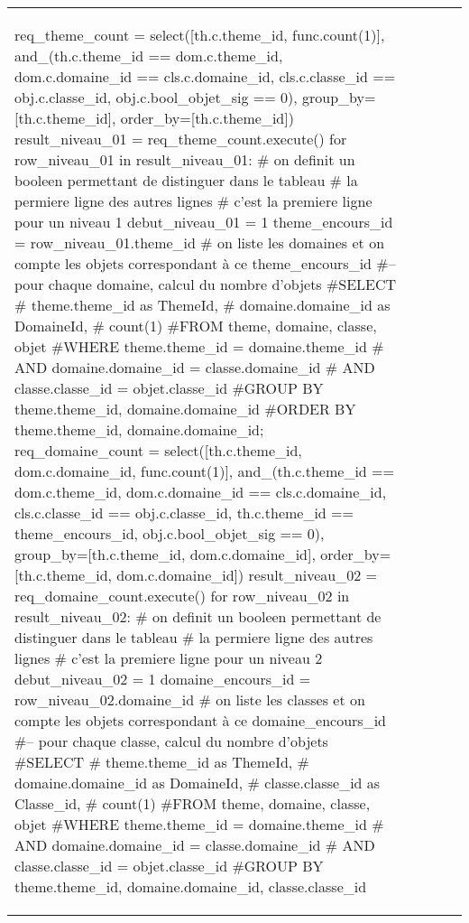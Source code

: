 \documentclass[12pt,titlepage]{book}
\begin{document}
\begin{supertabular}{|p{7.5cm}|p{7.5cm}|p{7.5cm}|c|p{10cm}|}
\begin{lbdpython}
req_theme_count = select([th.c.theme_id, func.count(1)],
                  and_(th.c.theme_id == dom.c.theme_id,
                       dom.c.domaine_id == cls.c.domaine_id,
                       cls.c.classe_id == obj.c.classe_id,
                       obj.c.bool_objet_sig == 0),
                  group_by=[th.c.theme_id],
                  order_by=[th.c.theme_id])
result_niveau_01 = req_theme_count.execute()
for row_niveau_01 in result_niveau_01:
   # on definit un booleen permettant de distinguer dans le tableau
   # la permiere ligne des autres lignes
   # c'est la premiere ligne pour un niveau 1
   debut_niveau_01 = 1
   theme_encours_id = row_niveau_01.theme_id
   # on liste les domaines et on compte les objets correspondant à ce theme_encours_id
   #-- pour chaque domaine, calcul du nombre d'objets
   #SELECT
   #   theme.theme_id as ThemeId,
   #   domaine.domaine_id as DomaineId,
   #   count(1)
   #FROM theme, domaine, classe, objet
   #WHERE theme.theme_id = domaine.theme_id
   #  AND domaine.domaine_id = classe.domaine_id
   #  AND classe.classe_id = objet.classe_id
   #GROUP BY theme.theme_id, domaine.domaine_id
   #ORDER BY theme.theme_id, domaine.domaine_id;
   req_domaine_count = select([th.c.theme_id, dom.c.domaine_id, func.count(1)],
                       and_(th.c.theme_id == dom.c.theme_id,
                            dom.c.domaine_id == cls.c.domaine_id,
                            cls.c.classe_id == obj.c.classe_id,
                            th.c.theme_id == theme_encours_id,
                            obj.c.bool_objet_sig == 0),
                       group_by=[th.c.theme_id, dom.c.domaine_id],
                       order_by=[th.c.theme_id, dom.c.domaine_id])
   result_niveau_02 = req_domaine_count.execute()
   for row_niveau_02 in result_niveau_02:
      # on definit un booleen permettant de distinguer dans le tableau
      # la permiere ligne des autres lignes
      # c'est la premiere ligne pour un niveau 2
      debut_niveau_02 = 1
      domaine_encours_id = row_niveau_02.domaine_id
      # on liste les classes et on compte les objets correspondant à ce domaine_encours_id
      #-- pour chaque classe, calcul du nombre d'objets
      #SELECT
      #   theme.theme_id as ThemeId,
      #   domaine.domaine_id as DomaineId,
      #   classe.classe_id as Classe_id,
      #   count(1)
      #FROM theme, domaine, classe, objet
      #WHERE theme.theme_id = domaine.theme_id 
      #  AND domaine.domaine_id = classe.domaine_id
      #  AND classe.classe_id = objet.classe_id
      #GROUP BY theme.theme_id, domaine.domaine_id, classe.classe_id

\end{lbdpython}
\end{supertabular}
\end{document}
